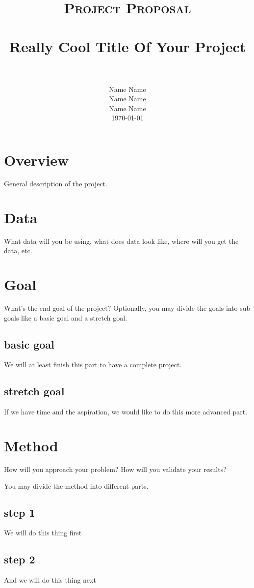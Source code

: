 \documentclass[paper=a4, fontsize=11pt]{scrartcl}
\title{
		\usefont{OT1}{bch}{b}{n}
		\normalfont \normalsize \textsc{Project Proposal} \\ [25pt]
		\horrule{0.5pt} \\[0.4cm]
		\huge Really Cool Title Of Your Project
 \\
		\horrule{2pt} \\[0.5cm]
}
\author{
		\normalfont 								\normalsize
       Name Name \\\normalsize Name Name \\  \normalsize Name Name \\[0.8cm]	
          \small{\today} 
}
\date{}
\numberwithin{equation}{section}		%
\numberwithin{figure}{section}			%
\numberwithin{table}{section}				%
\begin{document}
\maketitle


\section{\textbf{Overview}}
General description of the project. 
	 
\section{\textbf{Data}}
What data will you be using, what does data look like, where will you get the data, etc. 

\section{\textbf{Goal}}
What's the end goal of the project?
Optionally, you may divide the goals into sub goals like a basic goal and a stretch goal. 

\subsection{basic goal}
We will at least finish this part to have a complete project. 

\subsection{stretch goal}
If we have time and the aspiration, we would like to do this more advanced part. 

\section{\textbf{Method}}
How will you approach your problem?
How will you validate your results?

You may divide the method into different parts. 

\subsection{step 1}
We will do this thing first

\subsection{step 2}
And we will do this thing next
\end{document}
